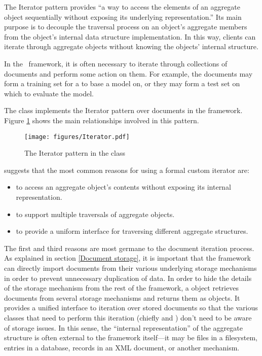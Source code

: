 The Iterator pattern provides ``a way to access the elements of an
aggregate object sequentially without exposing its underlying
representation.'' \cite[p. 257]{gamma:95} Its main purpose is to
decouple the traversal process on an object's aggregate members from
the object's internal data structure implementation.  In this way,
clients can iterate through aggregate objects without knowing the
objects' internal structure.

In the \aicat\ framework, it is often necessary to iterate
through collections of documents and perform some action on them.  For
example, the documents may form a training set for a  to base a
model on, or they may form a test set on which to evaluate the model.

The  class implements the Iterator pattern
\cite[p. 257]{gamma:95} over documents in the framework.  Figure
\ref{Iterator-collection} shows the main relationships involved in
this pattern.

\begin{figure}
\texttt{[image: figures/Iterator.pdf]}
\caption{The Iterator pattern in the  class}
\label{Iterator-collection}
\end{figure}


\cite[p. 259]{gamma:95} suggests that the most common reasons for
using a formal custom iterator are:

\begin{itemize}

\item to access an aggregate object's contents without exposing its
internal representation.

\item to support multiple traversals of aggregate objects.

\item to provide a uniform interface for traversing different
aggregate structures.

\end{itemize}

The first and third reasons are most germane to the document iteration
process.  As explained in section \ref{Document storage}, it is
important that the framework can directly import documents from their
various underlying storage mechanisms in order to prevent unnecessary
duplication of data.  In order to hide the details of the storage
mechanism from the rest of the framework, a  object
retrieves documents from several storage mechanisms and returns them
as  objects.  It provides a unified interface to iteration
over stored documents so that the various classes that need to perform
this iteration (chiefly  and ) don't need to be
aware of storage issues.  In this sense, the ``internal
representation'' of the aggregate structure is often external to the
framework itself---it may be files in a filesystem, entries in a
database, records in an XML document, or another mechanism.

